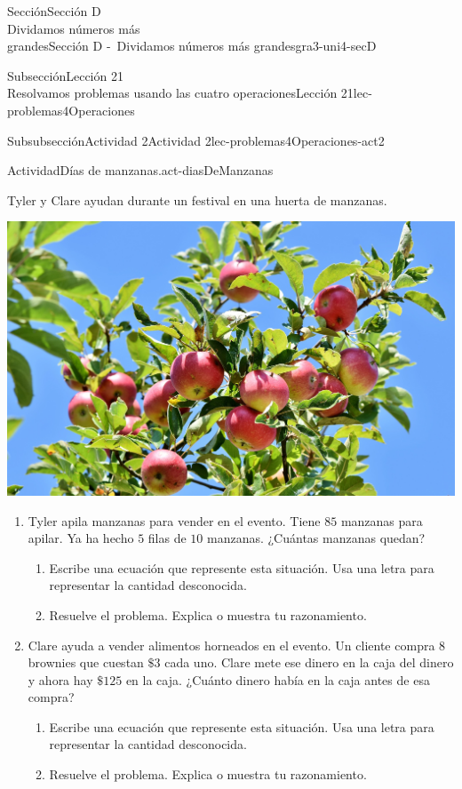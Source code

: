 \begin{sectionptx}{Sección}{{\Large Sección D\\}Dividamos números más\\grandes}{}{Sección D -~Dividamos números más grandes}{}{}{gra3-uni4-secD}
\begin{subsectionptx}{Subsección}{{\normalsize Lección 21\\[-0.05cm]}Resolvamos problemas usando las cuatro operaciones}{}{Lección 21}{}{}{lec-problemas4Operaciones}
%
\begin{subsubsectionptx}{Subsubsección}{Actividad 2}{}{Actividad 2}{}{}{lec-problemas4Operaciones-act2}
\begin{activity}{Actividad}{Días de manzanas.}{act-diasDeManzanas}%
\begin{sidebyside}{2}{0}{0.05}{0.05}%
\begin{sbspanel}{0.6}%
Tyler y Clare ayudan durante un festival en una huerta de manzanas.%
\end{sbspanel}%
\begin{sbspanel}{0.3}%
\includegraphics[max width=0.6\linewidth, center]{external/jpg-source/apple-3535566_1920.jpg}
\end{sbspanel}%
\end{sidebyside}%
\vspace{-0.3cm}
\begin{enumerate}
\item{}Tyler apila manzanas para vender en el evento. Tiene \(85\) manzanas para apilar. Ya ha hecho \(5\) filas de \(10\) manzanas. ¿Cuántas manzanas quedan?%
%
\begin{enumerate}
\item{}Escribe una ecuación que represente esta situación. Usa una letra para representar la cantidad desconocida.%
\item{}Resuelve el problema. Explica o muestra tu razonamiento.%
\end{enumerate}
\clearpage
\item{}Clare ayuda a vender alimentos horneados en el evento. Un cliente compra \(8\) brownies que cuestan \(\$3\) cada uno. Clare mete ese dinero en la caja del dinero y ahora hay \(\$125\) en la caja. ¿Cuánto dinero había en la caja antes de esa compra?%
%
\begin{enumerate}
\item{}Escribe una ecuación que represente esta situación. Usa una letra para representar la cantidad desconocida.%
\item{}Resuelve el problema. Explica o muestra tu razonamiento.%

\end{enumerate}
\end{enumerate}
\end{activity}
\end{subsubsectionptx}
\end{subsectionptx}
\end{sectionptx}
